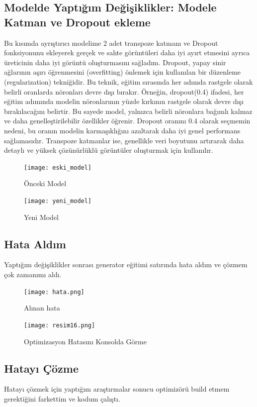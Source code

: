 \documentclass[10pt]{article}
\begin{document}
	\subsection{Modelde Yaptığım Değişiklikler: Modele Katman ve Dropout ekleme}
	Bu kısımda ayrıştırıcı modelime 2 adet transpoze katmanı ve Dropout fonksiyonunu ekleyerek gerçek ve sahte görüntüleri daha iyi ayırt etmesini ayrıca üreticinin daha iyi görüntü oluşturmasını sağladım. Dropout, yapay sinir ağlarının aşırı öğrenmesini (overfitting) önlemek için kullanılan bir düzenleme (regularization) tekniğidir. Bu teknik, eğitim sırasında her adımda rastgele olarak belirli oranlarda nöronları devre dışı bırakır. Örneğin, dropout(0.4) ifadesi, her eğitim adımında modelin nöronlarının yüzde kırkının rastgele olarak devre dışı bırakılacağını belirtir. Bu sayede model, yalnızca belirli nöronlara bağımlı kalmaz ve daha genelleştirilebilir özellikler öğrenir. Dropout oranını 0.4 olarak seçmemin nedeni, bu oranın modelin karmaşıklığını azaltarak daha iyi genel performans sağlamasıdır. Transpoze katmanlar ise, genellikle veri boyutunu artırarak daha detaylı ve yüksek çözünürlüklü görüntüler oluşturmak için kullanılır.
	
	\begin{figure}[htbp]
		\centering
		\texttt{[image: eski\_model]}
		\caption{Önceki Model}
		\label{fig:eski_model}
	\end{figure}
	
	\begin{figure}[htbp]
		\centering
		\texttt{[image: yeni\_model]}
		\caption{Yeni Model}
		\label{fig:yeni_model}
	\end{figure}
	
	\subsection{Hata Aldım}
	Yaptığım değişiklikler sonrası generator eğitimi satırında hata aldım ve çözmem çok zamanımı aldı.
	
	\begin{figure}[htbp]
		\centering
		\texttt{[image: hata.png]}
		\caption{Alınan hata}
		\label{fig:hata}
	\end{figure}
	
	\begin{figure}[htbp]
		\centering
		\texttt{[image: resim16.png]}
		\caption{Optimizasyon Hatasını Konsolda Görme}
		\label{fig:hata_cozumu}
	\end{figure}
	
	\subsection{Hatayı Çözme}
	Hatayı çözmek için yaptığım araştırmalar sonucu optimizörü build etmem gerektiğini farkettim ve kodum çalıştı. 
	
\end{document}
